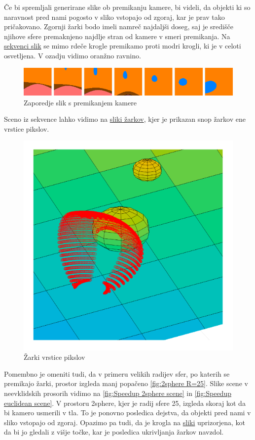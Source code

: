 \documentclass[titlepage]{article}
\begin{document}
\bigskip
Če bi spremljali generirane slike ob premikanju kamere, bi videli, da objekti ki so naravnost pred nami pogosto v sliko vstopajo od zgoraj, kar je prav tako pričakovano. Zgornji žarki bodo imeli namreč najdaljši doseg, saj je središče njihove sfere premaknjeno najdlje stran od kamere v smeri premikanja. Na \hyperref[fig:sequence]{sekvenci slik} se mimo rdeče krogle premikamo proti modri krogli, ki je v celoti osvetljena. V ozadju vidimo oranžno ravnino.
\begin{figure}[H]
    \centering
    \includegraphics[width=1\linewidth]{Images/sequence.png}
    \caption{Zaporedje slik s premikanjem kamere}
    \label{fig:sequence}
\end{figure}
Sceno iz sekvence lahko vidimo na \hyperref[fig:2sphRays2]{sliki žarkov}, kjer je prikazan snop žarkov ene vrstice pikslov.
\begin{figure}[H]
    \centering
    \includegraphics[width=0.4\linewidth]{Images/2sphere_rays2.png}
    \caption{Žarki vrstice pikslov}
    \label{fig:2sphRays2}
\end{figure}


Pomembno je omeniti tudi, da v primeru velikih radijev sfer, po katerih se premikajo žarki, prostor izgleda manj popačeno \ref{fig:2sphere R=25}. 
Slike scene v neevklidskih prosorih vidimo na \ref{fig:Speedup 2sphere scene} in \ref{fig:Speedup euclidean scene}. V prostoru 2sphere, kjer je radij sfere 25, izgleda skoraj kot da bi kamero usmerili v tla. To je 
ponovno posledica dejstva, da objekti pred nami v sliko vstopajo od zgoraj. Opazimo pa tudi, da je krogla na \hyperref[fig:2sphere R=25]{sliki} 
uprizorjena, kot da bi jo gledali z višje točke, kar je posledica ukrivljanja žarkov navzdol.
\end{document}
